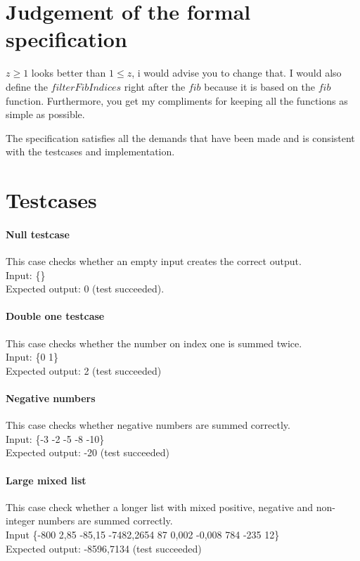 \documentclass[12pt]{article}
\begin{document}
\section{Judgement of the formal specification}

$z \geq 1$ looks better than $1 \leq z$, i would advise you to change that. I would also define the $filterFibIndices$ right after the $fib$ because it is based on the $fib$ function. Furthermore, you get my compliments for keeping all the functions as simple as possible. 

The specification satisfies all the demands that have been made and is consistent with the testcases and implementation.

\section{Testcases}

\paragraph{Null testcase}
This case checks whether an empty input creates the correct output. \\
Input: \{\} \\
Expected output: 0 (test succeeded).

\paragraph{Double one testcase}
This case checks whether the number on index one is summed twice. \\
Input: \{0 1\} \\
Expected output: 2 (test succeeded)

\paragraph{Negative numbers}
This case checks whether negative numbers are summed correctly. \\
Input: \{-3 -2 -5 -8 -10\} \\
Expected output: -20 (test succeeded)

\paragraph{Large mixed list}
This case check whether a longer list with mixed positive, negative and non-integer numbers are summed correctly. \\
Input \{-800 2,85 -85,15 -7482,2654 87 0,002 -0,008 784 -235 12\} \\
Expected output: -8596,7134 (test succeeded)
\end{document}
